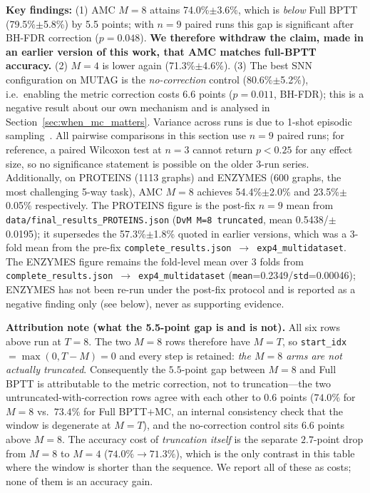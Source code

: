\documentclass[a4paper,fleqn]{cas-dc}
\begin{document}
\textbf{Key findings:} (1) AMC $M{=}8$ attains 74.0\%$\pm$3.6\%, which is \emph{below} Full BPTT (79.5\%$\pm$5.8\%) by 5.5 points; with $n{=}9$ paired runs this gap is significant after BH-FDR correction ($p{=}0.048$). \textbf{We therefore withdraw the claim, made in an earlier version of this work, that AMC matches full-BPTT accuracy.} (2) $M{=}4$ is lower again (71.3\%$\pm$4.6\%). (3) The best SNN configuration on MUTAG is the \emph{no-correction} control (80.6\%$\pm$5.2\%), i.e.\ enabling the metric correction costs 6.6 points ($p{=}0.011$, BH-FDR); this is a negative result about our own mechanism and is analysed in Section~\ref{sec:when_mc_matters}. Variance across runs is due to 1-shot episodic sampling~\citep{Sun24MSG}. All pairwise comparisons in this section use $n{=}9$ paired runs; for reference, a paired Wilcoxon test at $n{=}3$ cannot return $p<0.25$ for any effect size, so no significance statement is possible on the older 3-run series. Additionally, on PROTEINS (1113 graphs) and ENZYMES (600 graphs, the most challenging 5-way task), AMC $M{=}8$ achieves 54.4\%$\pm$2.0\% and 23.5\%$\pm$0.05\% respectively. The PROTEINS figure is the post-fix $n{=}9$ mean from \texttt{data/final\_results\_PROTEINS.json} (\texttt{DvM M=8 truncated}, mean 0.5438/$\pm$0.0195); it supersedes the 57.3\%$\pm$1.8\% quoted in earlier versions, which was a 3-fold mean from the pre-fix \texttt{complete\_results.json}~$\to$~\texttt{exp4\_multidataset}. The ENZYMES figure remains the fold-level mean over 3 folds from \texttt{complete\_results.json}~$\to$~\texttt{exp4\_multidataset} (\texttt{mean}=0.2349/\texttt{std}=0.00046); ENZYMES has not been re-run under the post-fix protocol and is reported as a negative finding only (see below), never as supporting evidence.

\textbf{Attribution note (what the 5.5-point gap is and is not).} All six rows above run at $T{=}8$. The two $M{=}8$ rows therefore have $M{=}T$, so \texttt{start\_idx}$=\max(0,T-M){=}0$ and every step is retained: \emph{the $M{=}8$ arms are not actually truncated}. Consequently the $5.5$-point gap between $M{=}8$ and Full BPTT is attributable to the metric correction, not to truncation---the two untruncated-with-correction rows agree with each other to $0.6$ points ($74.0\%$ for $M{=}8$ vs.\ $73.4\%$ for Full BPTT$+$MC, an internal consistency check that the window is degenerate at $M{=}T$), and the no-correction control sits $6.6$ points above $M{=}8$. The accuracy cost of \emph{truncation itself} is the separate $2.7$-point drop from $M{=}8$ to $M{=}4$ ($74.0\% \to 71.3\%$), which is the only contrast in this table where the window is shorter than the sequence. We report all of these as costs; none of them is an accuracy gain.
\end{document}

